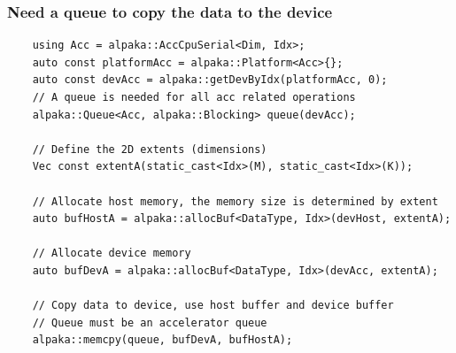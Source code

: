 \documentclass[9pt]{beamer}
\begin{document}
 \begin{frame}[fragile]
\frametitle{Need a queue to copy the data to the device}

\begin{lstlisting}
    using Acc = alpaka::AccCpuSerial<Dim, Idx>;
    auto const platformAcc = alpaka::Platform<Acc>{};
    auto const devAcc = alpaka::getDevByIdx(platformAcc, 0);
    // A queue is needed for all acc related operations
    alpaka::Queue<Acc, alpaka::Blocking> queue(devAcc);

    // Define the 2D extents (dimensions)
    Vec const extentA(static_cast<Idx>(M), static_cast<Idx>(K));

    // Allocate host memory, the memory size is determined by extent
    auto bufHostA = alpaka::allocBuf<DataType, Idx>(devHost, extentA);

    // Allocate device memory
    auto bufDevA = alpaka::allocBuf<DataType, Idx>(devAcc, extentA);

    // Copy data to device, use host buffer and device buffer
    // Queue must be an accelerator queue
    alpaka::memcpy(queue, bufDevA, bufHostA);

\end{lstlisting}
\end{frame}
\end{document}
